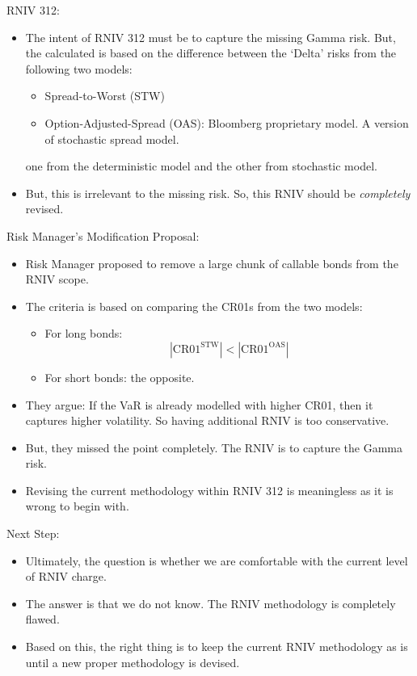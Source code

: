 \documentclass[10pt,a4paper]{article}
\newcommand{\CRdelta}{\mathrm{CR01}}
\begin{document}
RNIV 312: 
\begin{itemize}
	\item The intent of RNIV 312 must be to capture the missing Gamma risk. But, the calculated is based on the difference between the `Delta' risks from the following two models: 
	\begin{itemize}
		\item Spread-to-Worst (STW)
		\item Option-Adjusted-Spread (OAS): Bloomberg proprietary model. A version of stochastic spread model. 
	\end{itemize}
	one from the deterministic model and the other from stochastic model. 
	\item But, this is irrelevant to the missing risk. So, this RNIV should be {\em completely} revised. 
\end{itemize}

Risk Manager's Modification Proposal: 
\begin{itemize}
	\item Risk Manager proposed to remove a large chunk of callable bonds from the RNIV scope. 
	\item The criteria is based on comparing the CR01s from the two models: 
	\begin{itemize}
		\item For long bonds: 
		\begin{equation}
		|\CRdelta^{\mathrm{STW}}| < |\CRdelta^{\mathrm{OAS}}|
		\end{equation}
		\item For short bonds: the opposite.  
	\end{itemize}
	\item They argue: If the VaR is already modelled with higher CR01, then it captures higher volatility. So having additional RNIV is too conservative. 
	\item But, they missed the point completely. The RNIV is to capture the Gamma risk. 
	\item Revising the current methodology within RNIV 312 is meaningless as it is wrong to begin with. 
\end{itemize}

Next Step:
\begin{itemize}
	\item Ultimately, the question is whether we are comfortable with the current level of RNIV charge. 
	\item The answer is that we do not know. The RNIV methodology is completely flawed. 
	\item Based on this, the right thing is to keep the current RNIV methodology as is until a new proper methodology is devised. 
\end{itemize}
\end{document}
